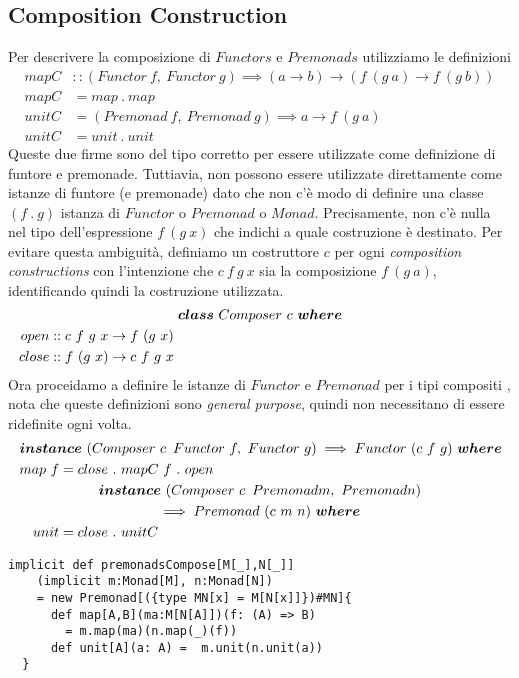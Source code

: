 \subsection{Composition Construction}
\label{composition_construction}

Per descrivere la composizione di $Functors$ e $Premonads$ utilizziamo le
definizioni
\begin{align*}
  mapC &:: (Functor\ f,\ Functor\ g) \implies (a \to b) \to
  (f \ (g \ a) \to f\ (g\ b))\\
  mapC &= map\ .\ map\\
  unitC &= (Premonad\ f,\ Premonad\ g) \implies a \to f\ (g\ a)\\
  unitC &= unit\ .\ unit
\end{align*}
Queste due firme sono del tipo corretto per essere utilizzate come definizione
di funtore e premonade.
Tuttiavia, non possono essere utilizzate direttamente come istanze di funtore (e
premonade) dato che non c'è modo di definire una classe $(f\ .\ g)$ istanza
di $Functor$ o $Premonad$ o $Monad$.
Precisamente, non c'è nulla nel tipo dell'espressione $f\ (g\ x)$ che indichi
a quale costruzione è destinato.
Per evitare questa ambiguità, definiamo un costruttore $c$ per ogni
\textit{composition constructions} con l'intenzione che $c\ f\ g\ x$ sia la
composizione $f\ (g\ a)$, identificando quindi la costruzione utilizzata.
\label{composer}
\begin{align*}
  \classdef{\bm{class}\ Composer\ c\ \bm{where}}
  open &:: c\ f\ g\ x \to f\ (g\ x)\\
  close &:: f\ (g\ x) \to c\ f\ g\ x
\end{align*}
Ora proceidamo a definire le istanze di $Functor$ e $Premonad$ per i tipi compositi
, nota che queste definizioni sono \textit{general purpose}, quindi non necessitano di essere
ridefinite ogni volta.
\begin{align*}
  \classdef{\bm{instance}\ (Composer\ c\,\ Functor\ f,\ Functor\ g) \implies Functor\ (c\ f\ g)\  \bm{where}}
  map\ f &= close\ .\ mapC\ f\ .\ open\\
  \classdef{\bm{instance}\ (Composer\ c\,\ Premonad m,\ Premonad n)}
  \classdef{\implies Premonad\ (c\ m\ n)\  \bm{where}}
  unit &= close\ .\ unitC
\end{align*}
\begin{lstlisting}[style=myScalastyle, caption=Natural map and unit operator]
  implicit def premonadsCompose[M[_],N[_]]
    (implicit m:Monad[M], n:Monad[N])
    = new Premonad[({type MN[x] = M[N[x]]})#MN]{
      def map[A,B](ma:M[N[A]])(f: (A) => B)
        = m.map(ma)(n.map(_)(f))
      def unit[A](a: A) =  m.unit(n.unit(a))
  }
  \end{lstlisting}
